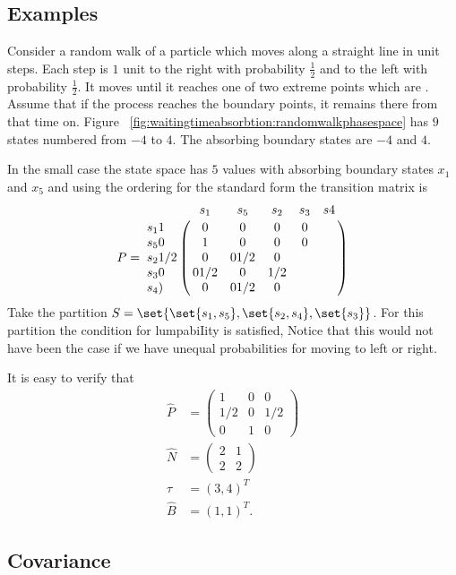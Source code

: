 \documentclass[12pt]{article}
\begin{document}
\subsection*{Examples}

\begin{example}
    Consider a random walk%
    of a particle which moves along a straight line in unit steps.  Each
    step is \( 1 \) unit to the right with probability \( \frac{1}{2} \) and to
    the left with probability \( \frac{1}{2} \).  It moves until it reaches
    one of two extreme points which are .~%
    Assume that if the process reaches the boundary points, it remains
    there from that time on.  Figure~%
    \ref{fig:waitingtimeabsorbtion:randomwalkphasespace} has \( 9 \)
    states numbered from \( -4 \) to \( 4 \).  The absorbing boundary
    states are \( -4 \) and \( 4 \).

    In the small case the state space has $5$ values with absorbing
    boundary states $x_1$ and $x_5$ and using the ordering for the
    standard form the transition matrix is
    \[
      P =
      \bordermatrix{
       & s_1 & s_5 & s_2 & s_3 & s4 \cr
      s_1 1 & 0 & 0 & 0 & 0 \cr
      s_5 0 & 1 & 0 & 0 & 0 \cr
      s_2 1/2 & 0 & 0 1/2 & 0 \cr
      s_3 0 & 0 1/2 & 0 & 1/2 \cr
      s_4 ) & 0 & 0 1/2 & 0 \cr
    }
  \]
  Take the partition $S = \set{ \set{s_1, s_5}, \set{s_2, s_4},
    \set{s_3}}$.  For  this  partition 
the condition for lumpabiIity is  satisfied, Notice  that this would not 
have  been the case  if we  have  unequal probabilities for  moving
to left or right.

It is easy to verify that
\begin{align*}
   \hat{P} &=
   \begin{pmatrix}
     1 & 0 & 0 \\
     1/2 & 0 & 1/2 \\
     0  & 1  & 0
   \end{pmatrix} \\
  \hat{N} &=
  \begin{pmatrix}
    2 & 1 \\
    2 & 2
  \end{pmatrix} \\
  \hat{\tau} &= (3, 4)^T \\
  \hat{B} &= (1,1)^T.
\end{align*}
 
\subsection*{Covariance}


\end{example}
\end{document}
